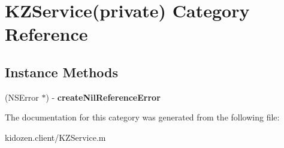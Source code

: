 \hypertarget{category_k_z_service_07private_08}{\section{K\-Z\-Service(private) Category Reference}
\label{category_k_z_service_07private_08}
}
\subsection*{Instance Methods}
\begin{DoxyCompactItemize}
\item 
\hypertarget{category_k_z_service_07private_08_a6fe9403b19c5294161f3ffd945ceb663}{(N\-S\-Error $\ast$) -\/ {\bfseries create\-Nil\-Reference\-Error}}\label{category_k_z_service_07private_08_a6fe9403b19c5294161f3ffd945ceb663}

\end{DoxyCompactItemize}


The documentation for this category was generated from the following file\-:\begin{DoxyCompactItemize}
\item 
kidozen.\-client/K\-Z\-Service.\-m\end{DoxyCompactItemize}
